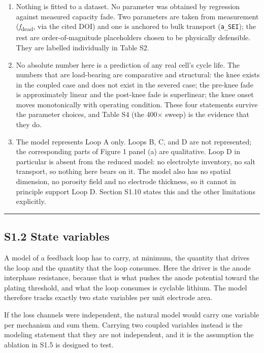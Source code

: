 \documentclass[11pt,a4paper]{article}
\begin{document}
\begin{enumerate}
  \item Nothing is fitted to a dataset. No parameter was obtained by regression against measured capacity fade. Two parameters are taken from measurement (\emph{f}\textsubscript{dead}, via the cited DOI) and one is anchored to bulk transport (\texttt{a\_SEI}); the rest are order-of-magnitude placeholders chosen to be physically defensible. They are labelled individually in Table S2.
  \item No absolute number here is a prediction of any real cell's cycle life. The numbers that are load-bearing are comparative and structural: the knee exists in the coupled case and does not exist in the severed case; the pre-knee fade is approximately linear and the post-knee fade is superlinear; the knee onset moves monotonically with operating condition. These four statements survive the parameter choices, and Table S4 (the 400\ensuremath{\times} sweep) is the evidence that they do.
  \item The model represents Loop A only. Loops B, C, and D are not represented; the corresponding parts of Figure 1 panel (a) are qualitative. Loop D in particular is absent from the reduced model: no electrolyte inventory, no salt transport, so nothing here bears on it. The model also has no spatial dimension, no porosity field and no electrode thickness, so it cannot in principle support Loop D. Section S1.10 states this and the other limitations explicitly.
\end{enumerate}


\par\noindent\rule{\linewidth}{0.4pt}\par


\subsection*{S1.2 State variables}


A model of a feedback loop has to carry, at minimum, the quantity that drives the loop and the quantity that the loop consumes. Here the driver is the anode interphase resistance, because that is what pushes the anode potential toward the plating threshold, and what the loop consumes is cyclable lithium. The model therefore tracks exactly two state variables per unit electrode area.


If the loss channels were independent, the natural model would carry one variable per mechanism and sum them. Carrying two coupled variables instead is the modeling statement that they are not independent, and it is the assumption the ablation in S1.5 is designed to test.
\end{document}
